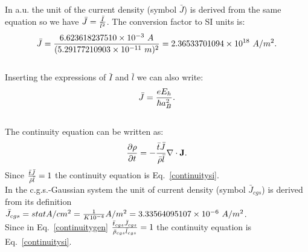 \documentclass[12pt,a4paper]{article}
\def\barl{5.29177210903\times 10^{-11}}
\def\bari{6.623618237510\times 10^{-3}}
\def\barcur{2.36533701094\times 10^{18}}
\def\curtocur{3.33564095107\times 10^{-6}}
\begin{document}
{\color{web-blue} In a.u. the unit of the current density (symbol $\bar J$) 
is derived 
from the same equation so we have $\bar J ={\bar I \over \bar l^2}$. The
conversion factor to SI units is: 
\begin{equation}
\bar J = {\bari\ A\over (\barl\ m)^2}=\barcur\ A/m^2. 
\end{equation}
\\
Inserting the expressions of $\bar I$ and $\bar l$ we can also write:
\begin{equation}
\bar J = {e E_h \over \hbar a_B^2}. 
\end{equation}
\\
The continuity equation can be written as:
\begin{equation}
{\partial \rho \over \partial t}=-{\bar t \bar J \over \bar \rho \bar l} 
\nabla \cdot {\bf J}.
\label{continuitygen}
\end{equation}
Since ${\bar t \bar J \over \bar \rho \bar l}=1$ the continuity equation 
is Eq.~\ref{continuitysi}.
}
\\

{\color{orange} In the c.g.s.-Gaussian system the unit of current density  
(symbol $\bar J_{cgs}$) is derived from its definition 
$\bar J_{cgs}=statA/cm^2 = {1 \over K 10^{-4}} A/m^2=\curtocur\ A/m^2$.
\\
Since in Eq.~\ref{continuitygen} ${\bar t_{cgs} \bar J_{cgs} \over 
\bar \rho_{cgs} \bar l_{cgs}}=1$ the continuity equation is 
Eq.~\ref{continuitysi}.
}
\\

\end{document}
